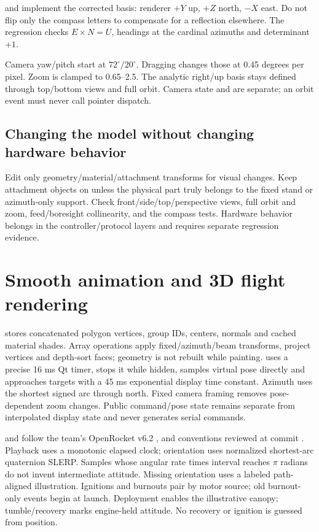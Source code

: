  and  implement the corrected basis:
renderer \(+Y\) up, \(+Z\) north, \(-X\) east. Do not flip only the compass letters
to compensate for a reflection elsewhere. The regression checks
\(E\times N=U\), headings at the cardinal azimuths and determinant \(+1\).

Camera yaw/pitch start at \(72^\circ/20^\circ\). Dragging changes those at
0.45 degrees per pixel. Zoom is clamped to 0.65--2.5. The analytic right/up basis
stays defined through top/bottom views and full orbit. Camera state and
 are separate; an orbit event must never call pointer dispatch.

\subsection{Changing the model without changing hardware behavior}
Edit only geometry/material/attachment transforms for visual changes. Keep
attachment objects on  unless the physical part truly belongs to
the fixed stand or azimuth-only support. Check front/side/top/perspective views,
full orbit and zoom, feed/boresight collinearity, and the compass tests.
Hardware behavior belongs in the controller/protocol layers and requires
separate regression evidence.

\section{Smooth animation and 3D flight rendering}

 stores concatenated polygon vertices, group IDs, centers, normals
and cached material shades. Array operations apply fixed/azimuth/beam transforms,
project vertices and depth-sort faces; geometry is not rebuilt while painting.
 uses a precise 16 ms Qt timer, stops it while hidden, samples
virtual pose directly and approaches targets with a 45 ms exponential display
time constant. Azimuth uses the shortest signed arc through north. Fixed camera
framing removes pose-dependent zoom changes. Public command/pose state remains
separate from interpolated display state and never generates serial commands.

 and  follow the team's OpenRocket v6.2
,  and 
conventions reviewed at commit . Playback uses a monotonic elapsed
clock; orientation uses normalized shortest-arc quaternion SLERP. Samples whose
angular rate times interval reaches $\pi$ radians do not invent intermediate
attitude. Missing orientation uses a labeled path-aligned illustration.
Ignitions and burnouts pair by motor source; old burnout-only events begin at
launch. Deployment enables the illustrative canopy; tumble/recovery marks
engine-held attitude. No recovery or ignition is guessed from position.

